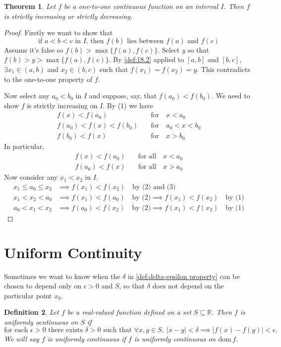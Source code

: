 \documentclass[12pt, lettersize]{book}
\newtheorem{thm}{Theorem}[section]
\newtheorem{dfn}[thm]{Definition}
\newcommand{\R}{\mathbb{R}}
\newcommand{\dom}{\text{dom}\,}
\begin{document}
	\setcounter{equation}{0}
	\begin{thm}
		Let $f$ be a \emph{one-to-one} continuous function on an interval $I$. Then $f$ is strictly increasing or strictly decreasing.
	\end{thm}
	\begin{proof}
		Firstly we want to show that
		\begin{equation}
			\text{if $a<b<c$ in $I$, then $f(b)$ lies between $f(a)$ and $f(c)$}
		\end{equation}
		Assume it's false so $f(b)>\max\{f(a),f(c)\}$. Select $y$ so that $f(b)>y>\max\{f(a),f(c)\}$. By \ref{def:18.2} applied to $[a,b]$ and $[b,c]$, $\exists x_1\in(a,b)$ and $x_2\in(b,c)$ such that $f(x_1)=f(x_2)=y$. This contradicts to the one-to-one property of $f$. 
		
		Now select any $a_0<b_0$ in $I$ and suppose, say, that $f(a_0)<f(b_0)$. We need to show $f$ is strictly increasing on $I$. By (1) we have
		\begin{align*}
			f(x)<f(a_0)\quad&\text{for}\quad x<a_0\\
			f(a_0)<f(x)<f(b_0)\quad&\text{for}\quad a_0<x<b_0\\
			f(b_0)<f(x)\quad&\text{for}\quad x>b_0
		\end{align*}
		In particular,
		\begin{align}
			f(x)<f(a_0)\quad&\text{for all}\quad x<a_0\\
			f(a_0)<f(x)\quad&\text{for all}\quad x>a_0
		\end{align}
		Now consider any $x_1<x_2$ in $I$.
		\begin{align*}
			x_1\leq a_0\leq x_2 &\implies f(x_1)<f(x_2)\quad\text{by (2) and (3)}\\
			x_1<x_2<a_0&\implies f(x_1)<f(a_0)\quad\text{by (2)} \implies f(x_1)<f(x_2)\quad\text{by (1)}\\
			a_0<x_1<x_2&\implies f(a_0)<f(x_2)\quad\text{by (2)} \implies f(x_1)<f(x_2)\quad\text{by (1)}
		\end{align*}
	\end{proof}
	\newpage
	\section{Uniform Continuity}
	Sometimes we want to know when the $\delta$ in \ref{def:delta-epsilon property} can be chosen to depend only on
	$\epsilon>0$ and $S$, so that $\delta$ does not depend on the particular point $x_0$.
	\begin{dfn}
		Let $f$ be a real-valued function defined on a set $S\subseteq\R$. Then $f$ is uniformly ocntinuous on $S$ if
		\begin{displaymath}
			\text{for each $\epsilon>0$ there exists $\delta>0$ such that $\forall x,y\in S,\ |x-y|<\delta\implies|f(x)-f(y)|<\epsilon.$}
		\end{displaymath}
		We will say $f$ is uniformly continuous if $f$ is uniformly continuous on $\dom f$.
	\end{dfn}
	
\end{document}
